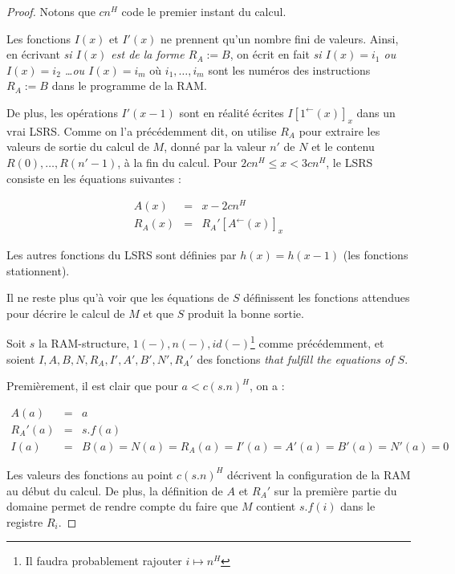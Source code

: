 \documentclass{article}
\newcommand{\eqpred}[3]{#1\left[ #2^{\leftarrow}(#3) \right]_{#3}}
\begin{document}
\begin{proof}
{\begin{minipage}{0.9\textwidth}
				\end{minipage}
				}
			
			Notons que $cn^H$ code le premier instant du calcul. 
			
			Les fonctions $I(x)$ et $I'(x)$ ne prennent qu'un nombre fini de valeurs. Ainsi, en écrivant \emph{si $I(x)$ est de la forme $R_A := B$}, on écrit en fait \emph{si $I(x) = i_1$ ou $I(x) = i_2$ \dots ou $I(x) = i_m$} où $i_1, \dots, i_m$ sont les numéros des instructions $R_A := B$ dans le programme de la RAM.
			
			De plus, les opérations $I'(x-1)$ sont en réalité écrites $\eqpred{I}{1}{x}$ dans un vrai LSRS. Comme on l'a précédemment dit, on utilise $R_A$ pour extraire les valeurs de sortie du calcul de $M$, donné par la valeur $n'$ de $N$ et le contenu $R(0), \dots, R(n'-1)$, à la fin du calcul. Pour $2cn^H \leqslant x < 3cn^H$, le LSRS consiste en les équations suivantes :
			
			\setcounter{equation}{0}
			\begin{eqnarray}
				A(x) & = & x - 2cn^H \\
				R_A(x) & = & \eqpred{R_A'}{A}{x}
			\end{eqnarray}
			
			Les autres fonctions du LSRS sont définies par $h(x) = h(x-1)$ (les fonctions stationnent).
			
			Il ne reste plus qu'à voir que les équations de $S$ définissent les fonctions attendues pour décrire le calcul de $M$ et que $S$ produit la bonne sortie.
			
			Soit $s$ la RAM-structure, $1(-), n(-), id(-)$\footnote{Il faudra probablement rajouter $i \mapsto n^H$} comme précédemment, et soient $I, A, B, N, R_A, I', A', B', N', R_A'$ des fonctions \emph{that fulfill the equations of $S$}\footnotemark.
			
				
			Premièrement, il est clair que pour $a < c(s.n)^H$, on a :
			
			\setcounter{equation}{0}
			\begin{eqnarray}
				A(a) & = & a \\
				R_A'(a) & = & s.f(a) \\
				I(a) & = & B(a) = N(a) = R_A(a) = I'(a) = A'(a) = B'(a) = N'(a) = 0
			\end{eqnarray}
			
			Les valeurs des fonctions au point $c(s.n)^H$ décrivent la configuration de la RAM au début du calcul. De plus, la définition de $A$ et $R_A'$ sur la première partie du domaine permet de rendre compte du faire que $M$ contient $s.f(i)$ dans le registre $R_i$.
			

\end{proof}
\end{document}
